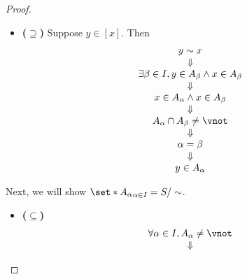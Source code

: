 \begin{proof}
\begin{enumerate}[label=\textbf{(\Alph*)}]
\begin{itemize}
\[\begin{array}{c}
                      \Downarrow                              \\
                      y \sim x                                \\
                      \Downarrow                              \\
                      y \in [x]
                    \end{array}
                  \]
            \item \textbf{($\supseteq$)} Suppose $y \in [x]$. Then
                  \[
                    \begin{array}{c}
                      y \sim x                                                   \\
                      \Downarrow                                                 \\
                      \exists \beta \in I, y \in A_{\beta} \land x \in A_{\beta} \\
                      \Downarrow                                                 \\
                      x \in A_{\alpha} \land x \in A_{\beta}                     \\
                      \Downarrow                                                 \\
                      A_{\alpha} \cap A_{\beta} \neq \vnot                       \\
                      \Downarrow                                                 \\
                      \alpha = \beta                                             \\
                      \Downarrow                                                 \\
                      y \in A_{\alpha}
                    \end{array}
                  \]
          \end{itemize}
          Next, we will show $\set*{A_{\alpha}}_{\alpha \in I} = S / \sim$.
          \begin{itemize}
            \item \textbf{($\subseteq$)}
                  \[
                    \begin{array}{c}
                      \forall \alpha \in I, A_{\alpha} \neq \vnot \\
                      \Downarrow                                  \\

\end{array}\]
\end{itemize}
\end{enumerate}
\end{proof}
